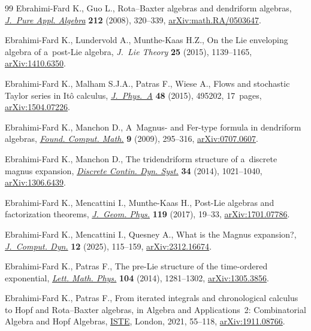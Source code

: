 \documentclass[pdftex]{sigma}
\numberwithin{equation}{section}
\theoremstyle{definition}
\begin{document}
\begin{thebibliography}{99}
Ebrahimi-Fard K., Guo L., Rota--{B}axter algebras and dendriform algebras,
 \href{https://doi.org/10.1016/j.jpaa.2007.05.025}{\textit{J.~Pure Appl.
 Algebra}} \textbf{212} (2008), 320--339,
 \href{http://arxiv.org/abs/math.RA/0503647}{arXiv:math.RA/0503647}.

Ebrahimi-Fard K., Lundervold A., Munthe-Kaas H.Z., On the {L}ie enveloping
 algebra of a~post-{L}ie algebra, \textit{J.~Lie Theory} \textbf{25} (2015),
 1139--1165, \href{http://arxiv.org/abs/1410.6350}{arXiv:1410.6350}.

Ebrahimi-Fard K., Malham S.J.A., Patras F., Wiese A., Flows and stochastic
 {T}aylor series in {I}t\^o calculus,
 \href{https://doi.org/10.1088/1751-8113/48/49/495202}{\textit{J.~Phys.~A}}
 \textbf{48} (2015), 495202, 17~pages,
 \href{http://arxiv.org/abs/1504.07226}{arXiv:1504.07226}.

Ebrahimi-Fard K., Manchon D., A~{M}agnus- and {F}er-type formula in dendriform
 algebras, \href{https://doi.org/10.1007/s10208-008-9023-3}{\textit{Found.
 Comput. Math.}} \textbf{9} (2009), 295--316,
 \href{http://arxiv.org/abs/0707.0607}{arXiv:0707.0607}.

Ebrahimi-Fard K., Manchon D., The tridendriform structure of a~discrete magnus
 expansion, \href{https://doi.org/10.3934/dcds.2014.34.1021}{\textit{Discrete
 Contin. Dyn. Syst.}} \textbf{34} (2014), 1021--1040,
 \href{http://arxiv.org/abs/1306.6439}{arXiv:1306.6439}.

Ebrahimi-Fard K., Mencattini I., Munthe-Kaas H., Post-{L}ie algebras and
 factorization theorems,
 \href{https://doi.org/10.1016/j.geomphys.2017.04.007}{\textit{J.~Geom.
 Phys.}} \textbf{119} (2017), 19--33,
 \href{http://arxiv.org/abs/1701.07786}{arXiv:1701.07786}.

Ebrahimi-Fard K., Mencattini I., Quesney A., What is the {M}agnus expansion?,
 \href{https://doi.org/10.3934/jcd.2024028}{\textit{J.~Comput. Dyn.}}
 \textbf{12} (2025), 115--159,
 \href{http://arxiv.org/abs/2312.16674}{arXiv:2312.16674}.

Ebrahimi-Fard K., Patras F., The pre-{L}ie structure of the time-ordered
 exponential, \href{https://doi.org/10.1007/s11005-014-0703-4}{\textit{Lett.
 Math. Phys.}} \textbf{104} (2014), 1281--1302,
 \href{http://arxiv.org/abs/1305.3856}{arXiv:1305.3856}.

Ebrahimi-Fard K., Patras F., From iterated integrals and chronological calculus
 to {H}opf and {R}ota--{B}axter algebras, in Algebra and Applications~2:
 Combinatorial Algebra and {H}opf Algebras,
 \href{https://doi.org/10.1002/9781119880912.ch2}{ISTE}, London, 2021,
 55--118, \href{http://arxiv.org/abs/1911.08766}{arXiv:1911.08766}.


\end{thebibliography}
\end{document}
